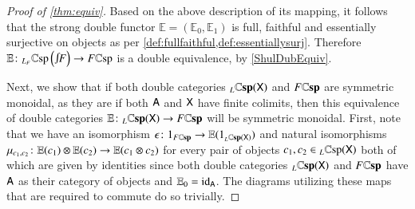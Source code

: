 \documentclass[reqno]{amsart}
\begin{document}
\begin{proof}[Proof of \cref{thm:equiv}]
\begin{comment}
\[
\begin{tikzpicture}[scale=1.5]
\node (B) at (0,0) {$R(x)$};
\node (C) at (2,0) {$R(x)+R(x')$};
\node (A') at (4,0) {$R(x)+_{c_2}R(x')$};
\node (B') at (4,-2) {$R(x+_{L(c_2)}x')$};
\node (D) at (0,-2) {$R(x+x')$};
\node (D') at (4,-1) {$R(x)+_{R(L(c_2))} R(x')$};
\path[->,font=\scriptsize,>=angle 90]
(C) edge node[above]{$j$} (A')
(B) edge node[above]{$\psi$} (C)
(D) edge node[above]{$R(J)$} (B')
(B) edge node [left]{$R(\zeta)$} (D)
(A') edge node [right]{$j_{\eta_{c_2}}$} (D')
(A') edge [out=345,in=15] node [right]{$\sigma$} (B')
(D') edge node [right]{$\kappa$} (B');
\end{tikzpicture}
\]
Lastly, this map of cospans comes with an isomorphism $$\tau \maps F(\sigma)(d_{\mathbb{E}(M) \odot \mathbb{E}(N)}) \to d_{\mathbb{E}(M \odot N)}$$ in $F(R(x+_{L(c_2)}x'))$. This shows that $\mathbb{E}$ is strong, and so 
\end{comment}

Based on the above description of its mapping, it follows that the strong double functor $\mathbb{E}=(\mathbb{E}_0,\mathbb{E}_1)$ is full, faithful and essentially surjective on objects as per \cref{def:fullfaithful,def:essentiallysurj}. Therefore $\mathbb{E} \maps \scsp{L_F}{\inta F} \to \dcsp{F}$ is a double equivalence, by \cref{ShulDubEquiv}.


Next, we show that if both double categories $_L \mathbf{\mathbb Csp}(\mathsf{X})$ and $F\mathbf{\mathbb Csp}$ are symmetric monoidal, as they are if both $\mathsf{A}$ and $\mathsf{X}$ have finite colimits, then this equivalence of double categories $\mathbb{E} \colon _L \mathbf{\mathbb Csp}(\mathsf{X}) \to F\mathbf{\mathbb Csp}$ will be symmetric monoidal. First, note that we have an isomorphism $\epsilon \colon 1_{F\mathbf{\mathbb Csp}} \to \mathbb{E}(1_{_L \mathbf{\mathbb Csp}(\mathsf{X})})$ and natural isomorphisms $\mu_{c_1,c_2} \colon \mathbb{E}(c_1) \otimes \mathbb{E}(c_2) \to \mathbb{E}(c_1 \otimes c_2)$ for every pair of objects $c_1,c_2 \in {_L \mathbb{C} \textnormal{sp}(\mathsf{X})}$ both of which are given by identities since both double categories $_L \mathbf{\mathbb Csp}(\mathsf{X})$ and $F\mathbf{\mathbb Csp}$ have $\mathsf{A}$ as their category of objects and $\mathbb{E}_0=\mathrm{id}_{\mathsf{A}}$. The diagrams utilizing these maps that are required to commute do so trivially.


\end{proof}
\end{document}
